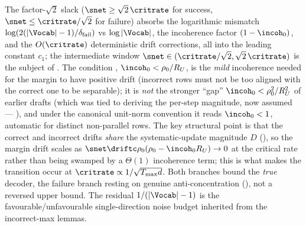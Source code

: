 \begin{remark}
\label{rem:R1_two_branches}
The factor-$\sqrt2$ slack ($\snet\ge\sqrt2\,\critrate$ for success,
$\snet\le\critrate/\sqrt2$ for failure) absorbs the logarithmic mismatch
$\log(2(|\Vocab|-1)/\delta_{\mathrm{fail}})$ vs $\log|\Vocab|$, the
incoherence factor $(1-\incoh_0)$, and the $O(\critrate)$ deterministic
drift corrections, all into the leading constant $c_1$; the intermediate
window $\snet\in(\critrate/\sqrt2,\sqrt2\,\critrate)$ is the subject of
. The condition , $\incoh_0<\rho_0/R_U$,
is the \emph{mild} incoherence needed for the margin to have positive drift
(incorrect rows must not be too aligned with the correct one to be
separable); it is \emph{not} the stronger ``gap'' $\incoh_0<\rho_0^2/R_U^2$
of earlier drafts (which was tied to deriving the per-step magnitude, now
assumed --- ), and under the canonical unit-norm
convention it reads $\incoh_0<1$, automatic for distinct non-parallel rows.
The key structural point is that the correct and incorrect drifts
\emph{share} the systematic-update magnitude $D$ (),
so the margin drift scales as $\snet\driftc\rho_0(\rho_0-\incoh_0 R_U)\to0$
at the critical rate rather than being swamped by a $\Theta(1)$ incoherence
term; this is what makes the transition occur at
$\critrate\propto1/\sqrt{T_{\max}d}$. Both branches bound the \emph{true}
decoder, the failure branch resting on genuine anti-concentration
(), not a reversed upper bound. The residual
$1/(|\Vocab|-1)$ is the favourable/unfavourable single-direction noise
budget inherited from the incorrect-max lemmas.
\end{remark}